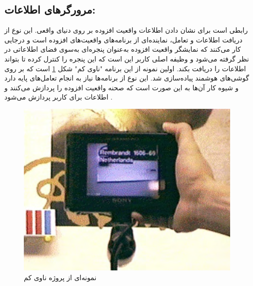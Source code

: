 \subsection{مرورگرهای اطلاعات\protect{}: }رابطی است برای نشان دادن اطلاعات واقعیت افزوده بر روی دنیای واقعی. این نوع از دریافت اطلاعات و تعامل، نماینده‌ای از برنامه‌های واقعیت‌های افزوده است و درجایی کار می‌کنند که نمایشگر واقعیت افزوده به‌عنوان پنجره‌ای به‌سوی فضای اطلاعاتی در نظر گرفته می‌شود و وظیفه اصلی کاربر این است که این پنجره را کنترل کرده تا بتواند اطلاعات را دریافت بکند. اولین نمونه از این برنامه "ناوی کم" شکل \ref{fig:navicam} است که بر روی گوشی‌های هوشمند پیاده‌سازی شد. این نوع از برنامه‌ها نیاز به انجام تعامل‌های پایه دارد و شیوه کار آن‌ها به این صورت است که صحنه واقعیت افزوده را پردازش می‌کنند و اطلاعات برای کاربر پردازش می‌شود \cite{Rekimoto}.
\begin{figure}[tb]
	\centering
	\includegraphics[width=0.6\linewidth]{image/navicam}
	\caption {نمونه‌ای از پروژه ناوی کم\cite{Rekimoto}}
	\label{fig:navicam}
\end{figure}
